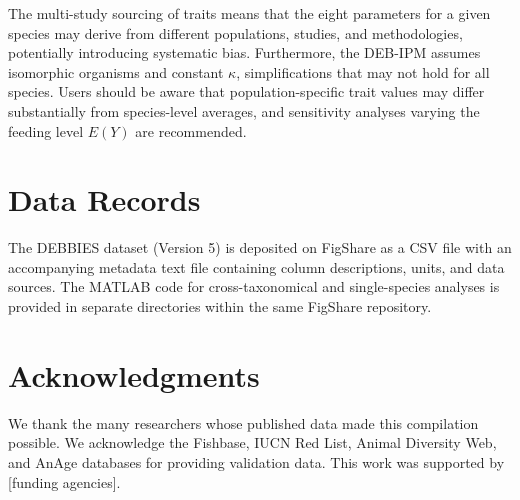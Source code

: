 \documentclass[11pt]{article}
\begin{document}
The multi-study sourcing of traits means that the eight parameters for a given species may derive from different populations, studies, and methodologies, potentially introducing systematic bias. Furthermore, the DEB-IPM assumes isomorphic organisms and constant $\kappa$, simplifications that may not hold for all species. Users should be aware that population-specific trait values may differ substantially from species-level averages, and sensitivity analyses varying the feeding level $E(Y)$ are recommended.

\section{Data Records}

The DEBBIES dataset (Version 5) is deposited on FigShare as a CSV file with an accompanying metadata text file containing column descriptions, units, and data sources. The MATLAB code for cross-taxonomical and single-species analyses is provided in separate directories within the same FigShare repository.

\section{Acknowledgments}

We thank the many researchers whose published data made this compilation possible. We acknowledge the Fishbase, IUCN Red List, Animal Diversity Web, and AnAge databases for providing validation data. This work was supported by [funding agencies].



\end{document}
